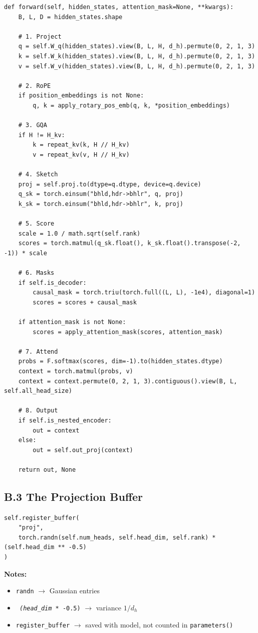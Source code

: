 \begin{lstlisting}
def forward(self, hidden_states, attention_mask=None, **kwargs):
    B, L, D = hidden_states.shape
    
    # 1. Project
    q = self.W_q(hidden_states).view(B, L, H, d_h).permute(0, 2, 1, 3)
    k = self.W_k(hidden_states).view(B, L, H, d_h).permute(0, 2, 1, 3)
    v = self.W_v(hidden_states).view(B, L, H, d_h).permute(0, 2, 1, 3)
    
    # 2. RoPE
    if position_embeddings is not None:
        q, k = apply_rotary_pos_emb(q, k, *position_embeddings)
    
    # 3. GQA
    if H != H_kv:
        k = repeat_kv(k, H // H_kv)
        v = repeat_kv(v, H // H_kv)
    
    # 4. Sketch
    proj = self.proj.to(dtype=q.dtype, device=q.device)
    q_sk = torch.einsum("bhld,hdr->bhlr", q, proj)
    k_sk = torch.einsum("bhld,hdr->bhlr", k, proj)
    
    # 5. Score
    scale = 1.0 / math.sqrt(self.rank)
    scores = torch.matmul(q_sk.float(), k_sk.float().transpose(-2, -1)) * scale
    
    # 6. Masks
    if self.is_decoder:
        causal_mask = torch.triu(torch.full((L, L), -1e4), diagonal=1)
        scores = scores + causal_mask
    
    if attention_mask is not None:
        scores = apply_attention_mask(scores, attention_mask)
    
    # 7. Attend
    probs = F.softmax(scores, dim=-1).to(hidden_states.dtype)
    context = torch.matmul(probs, v)
    context = context.permute(0, 2, 1, 3).contiguous().view(B, L, self.all_head_size)
    
    # 8. Output
    if self.is_nested_encoder:
        out = context
    else:
        out = self.out_proj(context)
    
    return out, None
\end{lstlisting}

\subsection{B.3 The Projection Buffer}

\begin{lstlisting}
self.register_buffer(
    "proj",
    torch.randn(self.num_heads, self.head_dim, self.rank) * (self.head_dim ** -0.5)
)
\end{lstlisting}

\textbf{Notes:}
\begin{itemize}
\item \texttt{randn} $\to$ Gaussian entries
\item \texttt{\textit{ (head\_dim }* -0.5)} $\to$ variance $1/d_h$
\item \texttt{register\_buffer} $\to$ saved with model, not counted in \texttt{parameters()}

\end{itemize}

